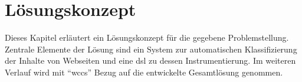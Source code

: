 \chapter{Lösungskonzept}
    \label{chapter:SolutionConcept}
    Dieses Kapitel erläutert ein Lösungskonzept für die gegebene Problemstellung.
    Zentrale Elemente der Lösung sind ein System zur automatischen Klassifizierung der Inhalte von Webseiten
    und eine \gls{dsl} zu dessen Instrumentierung.
    Im weiteren Verlauf wird mit "`\gls{wccs}"' Bezug auf die entwickelte
    Gesamtlösung genommen.

    
    
    
    
    
    
    
    
